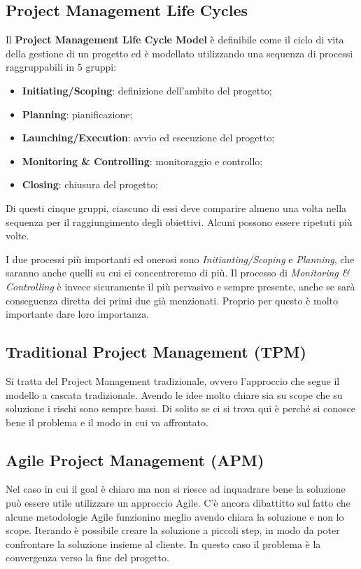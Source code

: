 \subsection{Project Management Life Cycles}
Il \textbf{Project Management Life Cycle Model} è definibile come il ciclo di vita della gestione di un progetto ed è modellato utilizzando una sequenza di processi raggruppabili in 5 gruppi:
\begin{itemize}
	\item \textbf{Initiating/Scoping}: definizione dell'ambito del progetto;
	\item \textbf{Planning}: pianificazione;
	\item \textbf{Launching/Execution}: avvio ed esecuzione del progetto;
	\item \textbf{Monitoring \& Controlling}: monitoraggio e controllo;
	\item \textbf{Closing}: chiusura del progetto;
\end{itemize}
Di questi cinque gruppi, ciascuno di essi deve comparire almeno una volta nella sequenza per il raggiungimento degli obiettivi. Alcuni possono essere ripetuti più volte.
\begin{info}
	I due processi più importanti ed onerosi sono \textit{Initianting/Scoping} e \textit{Planning}, che saranno anche quelli su cui ci concentreremo di più. Il processo di \textit{Monitoring \& Controlling} è invece sicuramente il più pervasivo e sempre presente, anche se sarà conseguenza diretta dei primi due già menzionati. Proprio per questo è molto importante dare loro importanza.
\end{info}
\subsection{Traditional Project Management (TPM)}
Si tratta del Project Management tradizionale, ovvero l'approccio che segue il modello a cascata tradizionale. Avendo le idee molto chiare sia su scope che su soluzione i rischi sono sempre bassi. Di solito se ci si trova qui è perché si conosce bene il problema e il modo in cui va affrontato.
\subsection{Agile Project Management (APM)}
Nel caso in cui il goal è chiaro ma non si riesce ad inquadrare bene la soluzione può essere utile utilizzare un approccio Agile. C'è ancora dibattitto sul fatto che alcune metodologie Agile funzionino meglio avendo chiara la soluzione e non lo scope. Iterando è possibile creare la soluzione a piccoli step, in modo da poter confrontare la soluzione insieme al cliente. In questo caso il problema è la convergenza verso la fine del progetto.
